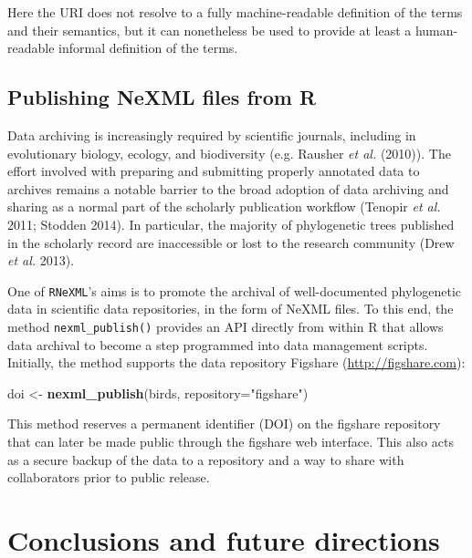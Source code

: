 \documentclass[author-year, review, 11pt]{components/elsarticle} %
\newenvironment{Shaded}{\begin{snugshade}}{\end{snugshade}}
\newcommand{\KeywordTok}[1]{\textcolor[rgb]{0.13,0.29,0.53}{\textbf{{#1}}}}
\newcommand{\DataTypeTok}[1]{\textcolor[rgb]{0.13,0.29,0.53}{{#1}}}
\newcommand{\StringTok}[1]{\textcolor[rgb]{0.31,0.60,0.02}{{#1}}}
\newcommand{\NormalTok}[1]{{#1}}
\begin{document}
Here the URI does not resolve to a fully machine-readable definition of
the terms and their semantics, but it can nonetheless be used to provide
at least a human-readable informal definition of the terms.

\subsection{Publishing NeXML files from
R}\label{publishing-nexml-files-from-r}

Data archiving is increasingly required by scientific journals,
including in evolutionary biology, ecology, and biodiversity (e.g.
Rausher \emph{et al.} (2010)). The effort involved with preparing and
submitting properly annotated data to archives remains a notable barrier
to the broad adoption of data archiving and sharing as a normal part of
the scholarly publication workflow (Tenopir \emph{et al.} 2011; Stodden
2014). In particular, the majority of phylogenetic trees published in
the scholarly record are inaccessible or lost to the research community
(Drew \emph{et al.} 2013).

One of \texttt{RNeXML}'s aims is to promote the archival of
well-documented phylogenetic data in scientific data repositories, in
the form of NeXML files. To this end, the method
\texttt{nexml\_publish()} provides an API directly from within R that
allows data archival to become a step programmed into data management
scripts. Initially, the method supports the data repository Figshare
(\url{http://figshare.com}):

\begin{Shaded}
\begin{Highlighting}[]
\NormalTok{doi <-}\StringTok{ }\KeywordTok{nexml_publish}\NormalTok{(birds, }\DataTypeTok{repository=}\StringTok{"figshare"}\NormalTok{)}
\end{Highlighting}
\end{Shaded}

This method reserves a permanent identifier (DOI) on the figshare
repository that can later be made public through the figshare web
interface. This also acts as a secure backup of the data to a repository
and a way to share with collaborators prior to public release.

\section{Conclusions and future
directions}\label{conclusions-and-future-directions}
\end{document}
